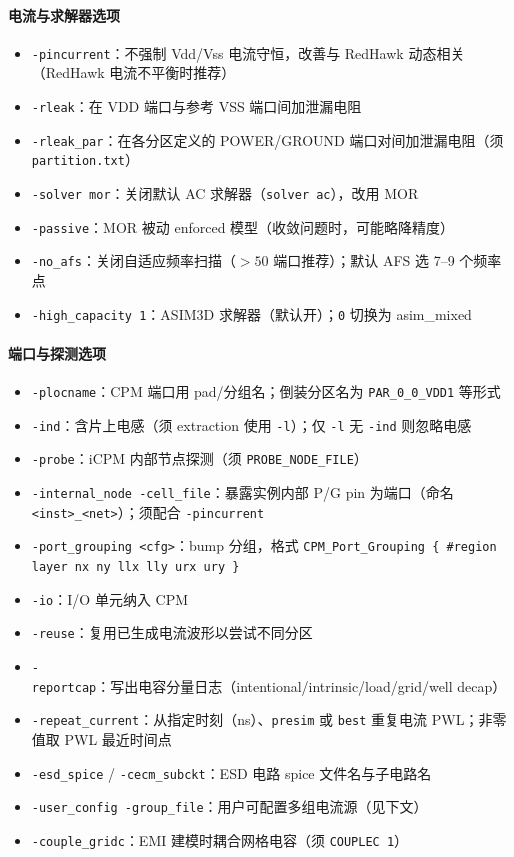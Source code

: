 \paragraph{电流与求解器选项}
\begin{itemize}
  \item \texttt{-pincurrent}：不强制 Vdd/Vss 电流守恒，改善与 RedHawk 动态相关（RedHawk 电流不平衡时推荐）
  \item \texttt{-rleak}：在 VDD 端口与参考 VSS 端口间加泄漏电阻
  \item \texttt{-rleak\_par}：在各分区定义的 POWER/GROUND 端口对间加泄漏电阻（须 \texttt{partition.txt}）
  \item \texttt{-solver mor}：关闭默认 AC 求解器（\texttt{solver ac}），改用 MOR
  \item \texttt{-passive}：MOR 被动 enforced 模型（收敛问题时，可能略降精度）
  \item \texttt{-no\_afs}：关闭自适应频率扫描（$>50$ 端口推荐）；默认 AFS 选 7--9 个频率点
  \item \texttt{-high\_capacity 1}：ASIM3D 求解器（默认开）；\texttt{0} 切换为 asim\_mixed
\end{itemize}

\paragraph{端口与探测选项}
\begin{itemize}
  \item \texttt{-plocname}：CPM 端口用 pad/分组名；倒装分区名为 \texttt{PAR\_0\_0\_VDD1} 等形式
  \item \texttt{-ind}：含片上电感（须 extraction 使用 \texttt{-l}）；仅 \texttt{-l} 无 \texttt{-ind} 则忽略电感
  \item \texttt{-probe}：iCPM 内部节点探测（须 \texttt{PROBE\_NODE\_FILE}）
  \item \texttt{-internal\_node -cell\_file}：暴露实例内部 P/G pin 为端口（命名 \texttt{<inst>\_<net>}）；须配合 \texttt{-pincurrent}
  \item \texttt{-port\_grouping <cfg>}：bump 分组，格式 \texttt{CPM\_Port\_Grouping \{ \#region layer nx ny llx lly urx ury \}}
  \item \texttt{-io}：I/O 单元纳入 CPM
  \item \texttt{-reuse}：复用已生成电流波形以尝试不同分区
  \item \texttt{-reportcap}：写出电容分量日志（intentional/intrinsic/load/grid/well decap）
  \item \texttt{-repeat\_current}：从指定时刻（ns）、\texttt{presim} 或 \texttt{best} 重复电流 PWL；非零值取 PWL 最近时间点
  \item \texttt{-esd\_spice} / \texttt{-cecm\_subckt}：ESD 电路 spice 文件名与子电路名
  \item \texttt{-user\_config -group\_file}：用户可配置多组电流源（见下文）
  \item \texttt{-couple\_gridc}：EMI 建模时耦合网格电容（须 \texttt{COUPLEC 1}）
\end{itemize}


